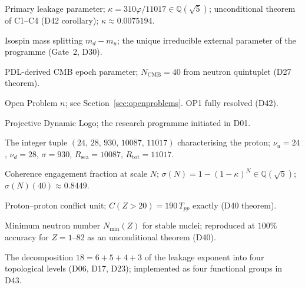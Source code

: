 \documentclass[11pt,a4paper]{article}
\theoremstyle{plain}
\theoremstyle{definition}
\theoremstyle{remark}
\newcommand{\quintuplet}{(24,\,28,\,930,\,10087,\,11017)}
\newcommand{\sigmaN}{\sigma(N)}
\newcommand{\Tpp}{T_{pp}}
\begin{document}
\begin{description}[leftmargin=3.5cm, style=nextline]
\item[$\kappa$] Primary leakage parameter; $\kappa=310\varphi/11017\in\mathbb{Q}(\sqrt{5})$; unconditional theorem of C1--C4 (D42 corollary); $\kappa\approx 0.0075194$.
\item[$m_{\mathrm{iso}}$] Isospin mass splitting $m_d-m_u$; the unique irreducible external parameter of the programme (Gate~2, D30).
\item[$N_{\mathrm{CMB}}$] PDL-derived CMB epoch parameter; $N_{\mathrm{CMB}}=40$ from neutron quintuplet (D27 theorem).
\item[OP$n$] Open Problem $n$; see Section~\ref{sec:openproblems}. OP1 fully resolved (D42).
\item[PDL] Projective Dynamic Logo; the research programme initiated in D01.
\item[Quintuplet] The integer tuple $\quintuplet$ characterising the proton; $\nu_u=24$, $\nu_d=28$, $\sigma=930$, $R_{\mathrm{sea}}=10087$, $R_{\mathrm{tot}}=11017$.
\item[$\sigmaN(N)$] Coherence engagement fraction at scale $N$; $\sigmaN=1-(1-\kappa)^N\in\mathbb{Q}(\sqrt{5})$; $\sigmaN(40)\approx 0.8449$.
\item[$\Tpp$] Proton--proton conflict unit; $C(Z>20)=190\,\Tpp$ exactly (D40 theorem).
\item[Valley of stability] Minimum neutron number $N_{\min}(Z)$ for stable nuclei; reproduced at $100\%$ accuracy for $Z=1$--82 as an unconditional theorem (D40).
\item[18-filter hierarchy] The decomposition $18=6+5+4+3$ of the leakage exponent into four topological levels (D06, D17, D23); implemented as four functional groups in D43.
\end{description}



\end{document}
